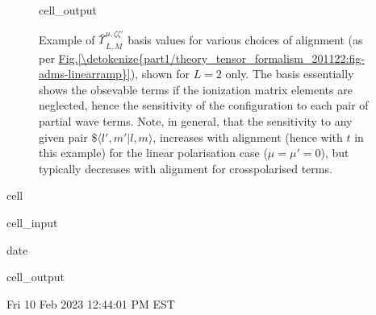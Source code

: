 \documentclass[letterpaper,table,10pt,english]{jupyterBook}
\begin{document}
\begin{figure}[htbp]
\centering
\capstart
\begin{sphinxVerbatimOutput}

\begin{sphinxuseclass}{cell_output}
\noindent{}

\end{sphinxuseclass}\end{sphinxVerbatimOutput}
\caption{Example of \(\bar{\varUpsilon_{}}_{L,M}^{u,\zeta\zeta'}\) basis values for various choices of alignment (as per \hyperref[\detokenize{part1/theory_tensor_formalism_201122:fig-adms-linearramp}]{Fig.\@ \ref{\detokenize{part1/theory_tensor_formalism_201122:fig-adms-linearramp}}}), shown for \(L=2\) only. The basis essentially shows the obsevable terms if the ionization matrix elements are neglected, hence the sensitivity of the configuration to each pair of partial wave terms. Note, in general, that the sensitivity to any given pair \$\(\langle l',m'|l,m\rangle\), increases with alignment (hence with \(t\) in this example) for the linear polarisation case (\(\mu=\mu'=0\)), but typically decreases with alignment for cross\sphinxhyphen{}polarised terms.}\label{\detokenize{part1/theory_tensor_formalism_201122:fig-channelfunc-linearramp}}\end{figure}

\begin{sphinxuseclass}{cell}\begin{sphinxVerbatimInput}

\begin{sphinxuseclass}{cell_input}
\begin{sphinxVerbatim}[commandchars=\\\{\}]
date
\end{sphinxVerbatim}

\end{sphinxuseclass}\end{sphinxVerbatimInput}
\begin{sphinxVerbatimOutput}

\begin{sphinxuseclass}{cell_output}
\begin{sphinxVerbatim}[commandchars=\\\{\}]
Fri 10 Feb 2023 12:44:01 PM EST
\end{sphinxVerbatim}

\end{sphinxuseclass}\end{sphinxVerbatimOutput}

\end{sphinxuseclass}
\sphinxstepscope
\end{document}
